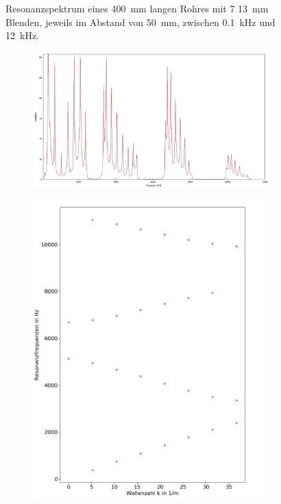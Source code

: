 \begin{figure}
\begin{subfigure}{0.34\textwidth}
\end{subfigure}
\caption{Resonanzspektrum eines 400~mm langen Rohres mit 7 13~mm Blenden, jeweils im Abstand von 50~mm, zwischen 0.1~kHz und 12~kHz.}
\label{fig:4_3_13}
\end{figure}
\begin{figure}
\centering
\begin{subfigure}{0.65\textwidth}
\includegraphics[width=\textwidth]{content/messungen/Chapter4/4_3_16mm.jpg}
\end{subfigure}
\begin{subfigure}{0.34\textwidth}
\includegraphics[width=\textwidth]{content/Scripts/4_3_16_red.jpg}

\end{subfigure}
\end{figure}
